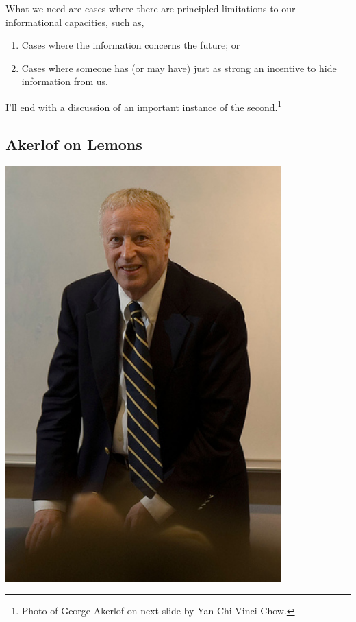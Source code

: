 \documentclass[
  letterpaper,
  DIV=11,
  numbers=noendperiod]{scrartcl}
\providecommand{\tightlist}{%
  \setlength{\itemsep}{0pt}\setlength{\parskip}{0pt}}\usepackage{longtable,booktabs,array}
\begin{document}
What we need are cases where there are principled limitations to our
informational capacities, such as,

\begin{enumerate}
\def\labelenumi{\arabic{enumi}.}
\tightlist
\item
  Cases where the information concerns the future; or
\item
  Cases where someone has (or may have) just as strong an incentive to
  hide information from us.
\end{enumerate}

I'll end with a discussion of an important instance of the
second.\footnote{Photo of George Akerlof on next slide by Yan Chi Vinci
  Chow.}

\subsection{Akerlof on Lemons}\label{akerlof-on-lemons}

\includegraphics[width=0.8\textwidth,height=0.8\textheight]{akerlof.jpg}
\end{document}
